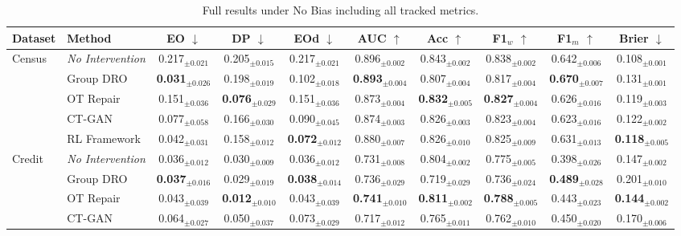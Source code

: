 \begin{table}[t]
\centering
\setlength{\tabcolsep}{5pt}
\caption{Full results under No Bias including all tracked metrics.}
\label{tab:nobias_full}
\begin{tabular}{llcccccccc}
\toprule
Dataset & Method & EO $\downarrow$ & DP $\downarrow$ & EOd $\downarrow$ & AUC $\uparrow$ & Acc $\uparrow$ & F1$_w$ $\uparrow$ & F1$_m$ $\uparrow$ & Brier $\downarrow$ \\
\midrule
\multirow{5}{*}{Census} & \textit{No Intervention} & 0.217$_{\pm 0.021}$ & 0.205$_{\pm 0.015}$ & 0.217$_{\pm 0.021}$ & 0.896$_{\pm 0.002}$ & 0.843$_{\pm 0.002}$ & 0.838$_{\pm 0.002}$ & 0.642$_{\pm 0.006}$ & 0.108$_{\pm 0.001}$ \\
 & Group DRO & \textbf{0.031$_{\pm 0.026}$} & 0.198$_{\pm 0.019}$ & 0.102$_{\pm 0.018}$ & \textbf{0.893$_{\pm 0.004}$} & 0.807$_{\pm 0.004}$ & 0.817$_{\pm 0.004}$ & \textbf{0.670$_{\pm 0.007}$} & 0.131$_{\pm 0.001}$ \\
 & OT Repair & 0.151$_{\pm 0.036}$ & \textbf{0.076$_{\pm 0.029}$} & 0.151$_{\pm 0.036}$ & 0.873$_{\pm 0.004}$ & \textbf{0.832$_{\pm 0.005}$} & \textbf{0.827$_{\pm 0.004}$} & 0.626$_{\pm 0.016}$ & 0.119$_{\pm 0.003}$ \\
 & CT-GAN & 0.077$_{\pm 0.058}$ & 0.166$_{\pm 0.030}$ & 0.090$_{\pm 0.045}$ & 0.874$_{\pm 0.003}$ & 0.826$_{\pm 0.003}$ & 0.823$_{\pm 0.004}$ & 0.623$_{\pm 0.016}$ & 0.122$_{\pm 0.002}$ \\
 & RL Framework & 0.042$_{\pm 0.031}$ & 0.158$_{\pm 0.012}$ & \textbf{0.072$_{\pm 0.012}$} & 0.880$_{\pm 0.007}$ & 0.826$_{\pm 0.010}$ & 0.825$_{\pm 0.009}$ & 0.631$_{\pm 0.013}$ & \textbf{0.118$_{\pm 0.005}$} \\
\midrule
\multirow{5}{*}{Credit} & \textit{No Intervention} & 0.036$_{\pm 0.012}$ & 0.030$_{\pm 0.009}$ & 0.036$_{\pm 0.012}$ & 0.731$_{\pm 0.008}$ & 0.804$_{\pm 0.002}$ & 0.775$_{\pm 0.005}$ & 0.398$_{\pm 0.026}$ & 0.147$_{\pm 0.002}$ \\
 & Group DRO & \textbf{0.037$_{\pm 0.016}$} & 0.029$_{\pm 0.019}$ & \textbf{0.038$_{\pm 0.014}$} & 0.736$_{\pm 0.029}$ & 0.719$_{\pm 0.029}$ & 0.736$_{\pm 0.024}$ & \textbf{0.489$_{\pm 0.028}$} & 0.201$_{\pm 0.010}$ \\
 & OT Repair & 0.043$_{\pm 0.039}$ & \textbf{0.012$_{\pm 0.010}$} & 0.043$_{\pm 0.039}$ & \textbf{0.741$_{\pm 0.010}$} & \textbf{0.811$_{\pm 0.002}$} & \textbf{0.788$_{\pm 0.005}$} & 0.443$_{\pm 0.023}$ & \textbf{0.144$_{\pm 0.002}$} \\
 & CT-GAN & 0.064$_{\pm 0.027}$ & 0.050$_{\pm 0.037}$ & 0.073$_{\pm 0.029}$ & 0.717$_{\pm 0.012}$ & 0.765$_{\pm 0.011}$ & 0.762$_{\pm 0.010}$ & 0.450$_{\pm 0.020}$ & 0.170$_{\pm 0.006}$ \\

\end{tabular}
\end{table}
